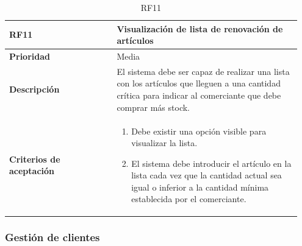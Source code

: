\begin{table}[H]
	\centering %
	\begin{tabular}{|p{0.35\linewidth}|p{0.6\linewidth}|}
		\hline
		\rowcolor{grayshade} \textbf{RF11} & \textbf{Visualización de lista de renovación de artículos} \\
		\hline
		\textbf{Prioridad} & Media \\
		\hline
		\textbf{Descripción} & El sistema debe ser capaz de realizar una lista con los artículos que lleguen a una cantidad crítica para indicar al comerciante que debe comprar más stock.\\
		\hline
		\vspace{0.5mm}
		\textbf{Criterios de aceptación} & 
		\begin{minipage}[t]{0.9\linewidth}
			\begin{enumerate}
				\item Debe existir una opción visible para visualizar la lista.
				\item El sistema debe introducir el artículo en la lista cada vez que la cantidad actual sea igual o inferior a la cantidad mínima establecida por el comerciante. 
			\end{enumerate}
			\vspace{2mm}
		\end{minipage} \\
		\hline
	\end{tabular}
	\caption{RF11}
\end{table}

\subsubsection{Gestión de clientes}

